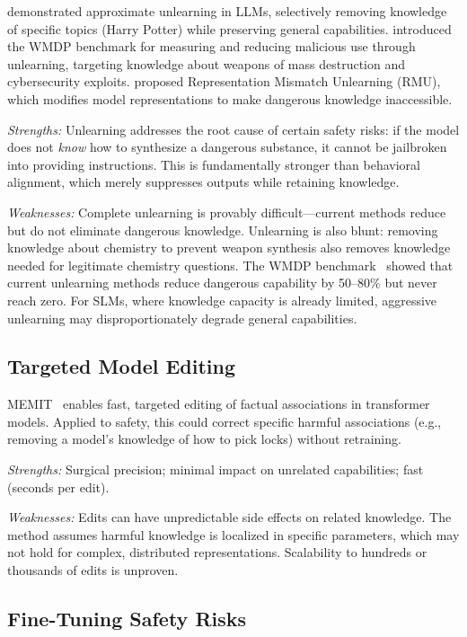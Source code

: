 \documentclass[12pt,a4paper]{article}
\begin{document}
\citet{eldan2023whosharry} demonstrated approximate unlearning in LLMs, selectively removing knowledge of specific topics (Harry Potter) while preserving general capabilities. \citet{li2024wmdp} introduced the WMDP benchmark for measuring and reducing malicious use through unlearning, targeting knowledge about weapons of mass destruction and cybersecurity exploits. \citet{liu2024rmu} proposed Representation Mismatch Unlearning (RMU), which modifies model representations to make dangerous knowledge inaccessible.

\emph{Strengths:} Unlearning addresses the root cause of certain safety risks: if the model does not \emph{know} how to synthesize a dangerous substance, it cannot be jailbroken into providing instructions. This is fundamentally stronger than behavioral alignment, which merely suppresses outputs while retaining knowledge.

\emph{Weaknesses:} Complete unlearning is provably difficult---current methods reduce but do not eliminate dangerous knowledge. Unlearning is also blunt: removing knowledge about chemistry to prevent weapon synthesis also removes knowledge needed for legitimate chemistry questions. The WMDP benchmark~\citep{li2024wmdp} showed that current unlearning methods reduce dangerous capability by 50--80\% but never reach zero. For SLMs, where knowledge capacity is already limited, aggressive unlearning may disproportionately degrade general capabilities.

\subsection{Targeted Model Editing}

MEMIT~\citep{mitchell2022memit} enables fast, targeted editing of factual associations in transformer models. Applied to safety, this could correct specific harmful associations (e.g., removing a model's knowledge of how to pick locks) without retraining.

\emph{Strengths:} Surgical precision; minimal impact on unrelated capabilities; fast (seconds per edit).

\emph{Weaknesses:} Edits can have unpredictable side effects on related knowledge. The method assumes harmful knowledge is localized in specific parameters, which may not hold for complex, distributed representations. Scalability to hundreds or thousands of edits is unproven.

\subsection{Fine-Tuning Safety Risks}
\end{document}
